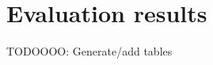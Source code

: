 \appendix




\chapter{Evaluation results}
\label{sec:appendix-evaluation-results}
TODOOOO: Generate/add tables